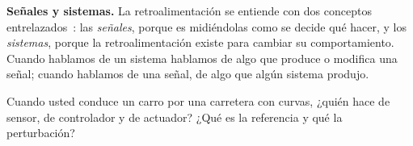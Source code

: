 \begin{ideaclave}
\textbf{Señales y sistemas.}
La retroalimentación se entiende con dos conceptos entrelazados~\citep{AlMa10}: las \emph{señales}, porque es midiéndolas como se decide qué hacer, y los \emph{sistemas}, porque la retroalimentación existe para cambiar su comportamiento. Cuando hablamos de un sistema hablamos de algo que produce o modifica una señal; cuando hablamos de una señal, de algo que algún sistema produjo.
\end{ideaclave}

\begin{pausa}
Cuando usted conduce un carro por una carretera con curvas, ¿quién hace de sensor, de controlador y de actuador? ¿Qué es la referencia y qué la perturbación?
\end{pausa}
